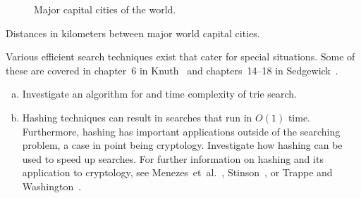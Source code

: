 \begin{problem}
\begin{landscape}
\begin{figure}[!htbp]
\centering
{}

\caption{Major capital cities of the world.}
\label{fig:graph_algorithms:worldmap_capital_cities}
\end{figure}
\end{landscape}

\begin{landscape}
\begin{table}[!htbp]
\centering
{}
{\tiny

}
\caption{Distances in kilometers between major world capital cities.}
\label{tab:graph_algorithms:capital_cities_distance}
\end{table}
\end{landscape}

\item Various efficient search techniques exist that cater for special
  situations. Some of these are covered in chapter~6 in
  Knuth~\cite{Knuth1998} and chapters~14--18 in
  Sedgewick~\cite{Sedgewick1990}.
  \begin{enumerate}[(a)]
  \item Investigate an algorithm for and time complexity of trie
    search.

  \item Hashing techniques can result in searches that run in $O(1)$
    time. Furthermore, hashing has important applications outside of the
    searching problem, a case in point being cryptology. Investigate how
    hashing can be used to speed up searches. For further information
    on hashing and its application to cryptology, see
    Menezes~et~al.~\cite{MenezesEtAl1996}, Stinson~\cite{Stinson2002},
    or Trappe and Washington~\cite{TrappeWashington2006}.
  \end{enumerate}


\end{problem}
